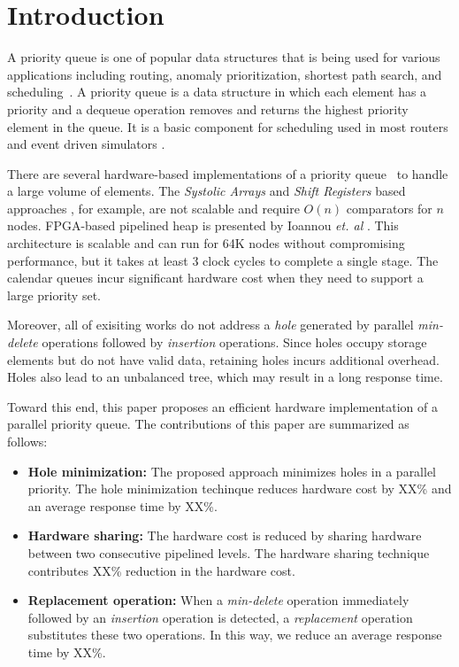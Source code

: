 \section{Introduction}

A priority queue is one of popular data structures that is being used for various applications including routing, anomaly prioritization, shortest path search, and scheduling~\cite{web,ah1,ah2,ah3}.
A priority queue is a data structure in which each element has a priority and a dequeue operation removes and returns the highest priority element in the queue. 
It is a basic component for scheduling used in most routers and event driven simulators \cite{hw1,fpga1}.

There are several hardware-based implementations of a priority queue~\cite{hw1,hw2,hw8,hw9,fpga1,fpga2,fpga3} to handle a large volume of elements.
The {\it Systolic Arrays} and {\it Shift Registers} based approaches \cite{hw8,hw9}, for example, are not scalable and require $O(n)$ comparators for $n$ nodes. 
FPGA-based pipelined heap is presented by Ioannou {\it et. al} \cite{fpga1}. 
This architecture is scalable and can run for 64K nodes without compromising performance, but it takes at least 3 clock cycles to complete a single stage. 
The calendar queues \cite{hw1} incur significant hardware cost when they need to support a large priority set.

Moreover, all of exisiting works do not address a {\it hole} generated by parallel {\it min-delete} operations followed by {\it insertion} operations. 
Since holes occupy storage elements but do not have valid data, retaining holes incurs additional overhead.
Holes also lead to an unbalanced tree, which may result in a long response time.

Toward this end, this paper proposes an efficient hardware implementation of a parallel priority queue.
The contributions of this paper are summarized as follows:
\begin{itemize}
\item {\bf Hole minimization:} The proposed approach minimizes holes in a parallel priority. The hole minimization techinque reduces hardware cost by XX\% and an average response time by XX\%.
\item {\bf Hardware sharing:} The hardware cost is reduced by sharing hardware between two consecutive pipelined levels. The hardware sharing technique contributes XX\% reduction in the hardware cost.
\item {\bf Replacement operation:} When a {\it min-delete} operation immediately followed by an {\it insertion} operation is detected, a {\it replacement} operation substitutes these two operations. In this way, we reduce an average response time by XX\%.
\end{itemize}
